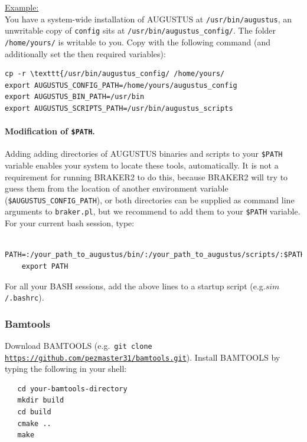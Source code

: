 \documentclass[a4paper,10pt]{report}
\begin{document}
\noindent \underline{Example:}\\

You have a system-wide installation of AUGUSTUS at \texttt{/usr/bin/augustus}, an unwritable copy of \texttt{config} sits at \texttt{/usr/bin/augustus\_config/}. The folder \texttt{/home/yours/} is writable to you. Copy with the following command (and additionally set the then required variables):\\

\begin{verbatim}
cp -r \texttt{/usr/bin/augustus_config/ /home/yours/
export AUGUSTUS_CONFIG_PATH=/home/yours/augustus_config
export AUGUSTUS_BIN_PATH=/usr/bin
export AUGUSTUS_SCRIPTS_PATH=/usr/bin/augustus_scripts
\end{verbatim}


   
   \paragraph{Modification of \texttt{\$PATH}.} Adding adding directories of AUGUSTUS binaries and scripts to your \texttt{\$PATH} variable enables your system to locate these tools, automatically. It is not a requirement for running BRAKER2 to do this, because BRAKER2 will try to guess them from the location of another environment variable (\texttt{\$AUGUSTUS\_CONFIG\_PATH}), or both directories can be supplied as command line arguments to \texttt{braker.pl}, but we recommend to add them to your \texttt{\$PATH} variable. For your current bash session, type:

    \begin{verbatim}
    PATH=:/your_path_to_augustus/bin/:/your_path_to_augustus/scripts/:$PATH
    export PATH
    \end{verbatim}

    For all your BASH sessions, add the above lines to a startup script (e.g.\texttt{$sim$/.bashrc}).

   

\subsubsection{Bamtools}

Download BAMTOOLS (e.g.~\texttt{git clone \url{https://github.com/pezmaster31/bamtools.git}}). Install BAMTOOLS by typing the following in your shell:\\

 \begin{verbatim}
   cd your-bamtools-directory
   mkdir build
   cd build
   cmake ..
   make
 \end{verbatim}
\end{document}
